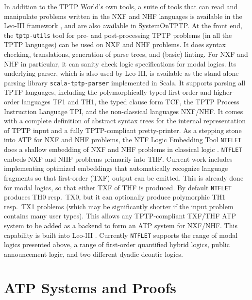 \documentclass[runningheads]{llncs}
\begin{document}
In addition to the TPTP World's own tools, a suite of tools that can read and manipulate 
problems written in the NXF and NHF languages is available in the Leo-III framework \cite{SB21},
and are also available in SystemOnTPTP.
At the front end, the {\tt tptp-utils} tool \cite{Ste22-TU} for pre- and post-processing TPTP 
problems (in all the TPTP languages) can be used on NXF and NHF problems.
It does syntax checking, translations, generation of parse trees, and (basic) linting.
For NXF and NHF in particular, it can sanity check logic specifications for modal logics.
Its underlying parser, which is also used by Leo-III, is available as the stand-alone parsing library {\tt scala-tptp-parser} \cite{Ste21} implemented in Scala.
It supports parsing all TPTP languages, including the polymorphically typed first-order and higher-order languages
TF1 and TH1, the typed clause form TCF, the TPTP Process Instruction Language TPI, and the non-classical languages NXF/NHF.
It comes with a complete definition of abstract syntax trees for the internal representation of TPTP input and a fully TPTP-compliant 
pretty-printer. 
As a stepping stone into ATP for NXF and NHF problems, the NTF Logic Embedding Tool {\tt NTFLET} 
\cite{Ste22-LE} does a shallow embedding of NXF and NHF problems in classical logic 
\cite{BP13,BR13,GSB17,GS18}.
{\tt NTFLET} embeds NXF and NHF problems primarily into THF.
Current work includes implementing optimized embeddings that automatically recognize language fragments
so that first-order (TXF) output can be emitted. This is already done for modal logics, so that
either TXF of THF is produced. By default {\tt NTFLET} produces TH0 resp.\ TX0, but it can optionally
produce polymorphic TH1 resp.\ TX1 problems (which may be significantly shorter if the input problem
contains many user types).
This allows any TPTP-compliant TXF/THF ATP system to be added as a backend to form an 
ATP system for NXF/NHF.
This capability is built into Leo-III \cite{SB21,DBLP:conf/paar/Steen22}.
Currently {\tt NTFLET} supports the range of modal logics presented above, a range of first-order
quantified hybrid logics, public announcement logic, and two different dyadic deontic logics.

\section{ATP Systems and Proofs}
\label{ATPSystems}
\end{document}
